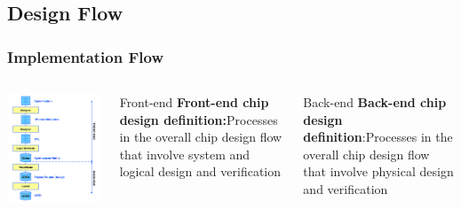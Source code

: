 \documentclass[compress]{beamer}
\begin{document}
\subsection[Implementation]{Design Flow}
\begin{frame}
	\frametitle{Implementation Flow}
			\begin{columns}	
		\begin{center}
			\includegraphics[width=0.7 \textwidth]{flow_2}
		\end{center}
		\begin{block}{Front-end}
			\textbf{Front-end chip design definition:}Processes in
			the overall chip design flow that involve system and logical design and verification
		\end{block}	
	\begin{block}{Back-end}
		\textbf{Back-end chip design definition}:Processes in the
		overall chip design flow that involve physical design and verification
	\end{block}	
	\end{columns}
\end{frame}
\end{document}
